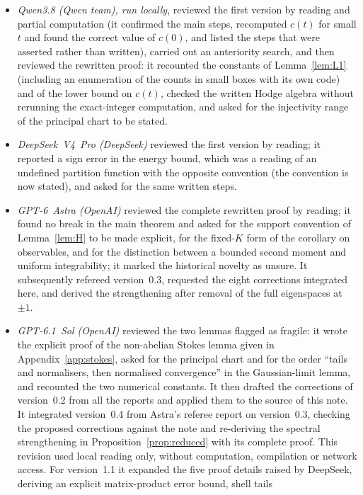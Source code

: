 \documentclass[11pt,a4paper]{article}
\theoremstyle{plain}
\theoremstyle{definition}
\theoremstyle{remark}
\numberwithin{equation}{section}
\begin{document}
\begin{itemize}
the programs of \S\ref{sec:repro} in the sandbox, made the editorial changes of this version~1.0 and prepared the deposit package.
\item \emph{Qwen3.8 (Qwen team), run locally}, reviewed the first version by reading and partial computation (it confirmed the main
steps, recomputed $c(t)$ for small $t$ and found the correct value of $c(0)$, and listed the steps that were asserted rather than
written), carried out an anteriority search, and then reviewed the rewritten proof: it recounted the constants of
Lemma~\ref{lem:L1} (including an enumeration of the counts in small boxes with its own code) and of the lower bound on $c(t)$, checked
the written Hodge algebra without rerunning the exact-integer computation, and asked for the injectivity range of the principal chart
to be stated.
\item \emph{DeepSeek~V4~Pro (DeepSeek)} reviewed the first version by reading; it reported a sign error in the energy bound, which was a
reading of an undefined partition function with the opposite convention (the convention is now stated), and asked for the same written
steps.
\item \emph{GPT-6~Astra (OpenAI)} reviewed the complete rewritten proof by reading; it found no break in the main theorem and asked for
the support convention of Lemma~\ref{lem:H} to be made explicit, for the fixed-$K$ form of the corollary on observables, and for the
distinction between a bounded second moment and uniform integrability; it marked the historical novelty as unsure.
It subsequently refereed version~0.3, requested the eight corrections integrated here, and derived the strengthening after removal of
the full eigenspaces at $\pm1$.
\item \emph{GPT-6.1~Sol (OpenAI)} reviewed the two lemmas flagged as fragile: it wrote the explicit proof of the non-abelian Stokes
lemma given in Appendix~\ref{app:stokes}, asked for the principal chart and for the order ``tails and normalisers, then normalised
convergence'' in the Gaussian-limit lemma, and recounted the two numerical constants. It then drafted the corrections of version~0.2
from all the reports and applied them to the source of this note. It integrated version~0.4 from Astra's referee report on version~0.3,
checking the proposed corrections against the note and re-deriving the spectral strengthening in Proposition~\ref{prop:reduced} with
its complete proof. This revision used local reading only, without computation, compilation or network access.
For version~1.1 it expanded the five proof details raised by DeepSeek, deriving an explicit matrix-product error bound, shell tails

\end{itemize}
\end{document}
